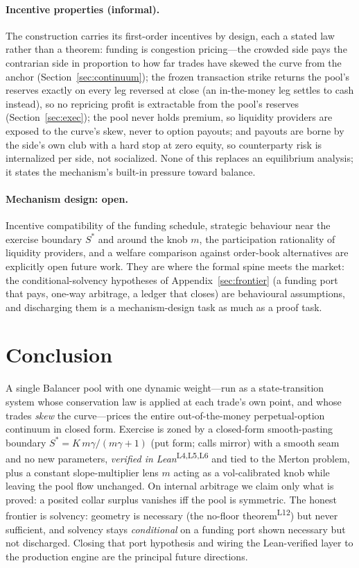 \documentclass[runningheads]{llncs}
\newcommand{\tfp}{\emph{verified in Lean}}
\begin{document}
\paragraph{Incentive properties (informal).}
The construction carries its first-order incentives by design, each a stated law
rather than a theorem: funding is congestion pricing---the crowded side pays the
contrarian side in proportion to how far trades have skewed the curve from the
anchor (Section~\ref{sec:continuum}); the frozen transaction strike returns the
pool's reserves exactly on every leg reversed at close (an in-the-money leg
settles to cash instead), so no repricing profit is extractable from the pool's
reserves (Section~\ref{sec:exec}); the pool never holds premium, so liquidity
providers are exposed to the curve's skew, never to option payouts; and payouts
are borne by the side's own club with a hard stop at zero equity, so counterparty
risk is internalized per side, not socialized. None of this replaces an
equilibrium analysis; it states the mechanism's built-in pressure toward balance.

\paragraph{Mechanism design: open.}
Incentive compatibility of the funding schedule, strategic behaviour near the
exercise boundary $S^{\ast}$ and around the knob $m$, the participation
rationality of liquidity providers, and a welfare comparison against order-book
alternatives are explicitly open future work. They are where the formal spine
meets the market: the conditional-solvency hypotheses of
Appendix~\ref{sec:frontier} (a funding port that pays, one-way arbitrage, a ledger
that closes) are behavioural assumptions, and discharging them is a
mechanism-design task as much as a proof task.

\section{Conclusion}\label{sec:conclusion}
A single Balancer pool with one dynamic weight---run as a state-transition system
whose conservation law is applied at each trade's own point, and whose trades
\emph{skew} the curve---prices the entire out-of-the-money perpetual-option
continuum in closed form. Exercise is zoned by a closed-form
smooth-pasting boundary
$S^{\ast}=K\,m\gamma/(m\gamma+1)$ (put form; calls mirror) with a smooth
seam and no new parameters,
\tfp{}\textsuperscript{L4,L5,L6} and tied to the Merton problem,
plus a constant slope-multiplier lens $m$ acting as a vol-calibrated knob while
leaving the pool flow unchanged. On internal arbitrage we claim only what is
proved: a posited collar surplus vanishes iff the pool is symmetric. The honest
frontier is solvency: geometry is necessary (the no-floor
theorem\textsuperscript{L12}) but never sufficient, and solvency stays
\emph{conditional} on a funding port shown necessary but not discharged. Closing
that port hypothesis and wiring the Lean-verified layer to the
production engine are the principal future directions.
\end{document}
